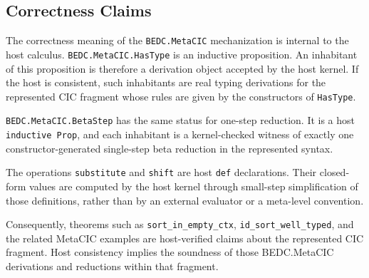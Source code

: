 \subsection{Correctness Claims}\label{subsec:reconstruction-correctness-claims}

The correctness meaning of the \texttt{BEDC.MetaCIC} mechanization is internal
to the host calculus. \texttt{BEDC.MetaCIC.HasType} is an inductive
proposition. An inhabitant of this proposition is therefore a derivation object
accepted by the host kernel. If the host is consistent, such inhabitants are
real typing derivations for the represented CIC fragment whose rules are given
by the constructors of \texttt{HasType}.

\texttt{BEDC.MetaCIC.BetaStep} has the same status for one-step reduction. It
is a host \texttt{inductive Prop}, and each inhabitant is a kernel-checked
witness of exactly one constructor-generated single-step beta reduction in the
represented syntax.

The operations \texttt{substitute} and \texttt{shift} are host
\texttt{def} declarations. Their closed-form values are computed by the host
kernel through small-step simplification of those definitions, rather than by
an external evaluator or a meta-level convention.

Consequently, theorems such as \texttt{sort\_in\_empty\_ctx},
\texttt{id\_sort\_well\_typed}, and the related MetaCIC examples are
host-verified claims about the represented CIC fragment. Host consistency
implies the soundness of those BEDC.MetaCIC derivations and reductions within
that fragment.
